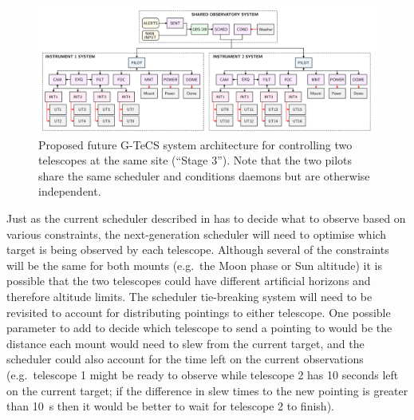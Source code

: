 \begin{colsection}
\begin{figure}[t]
    \begin{center}
        \includegraphics[width=\linewidth]{images/flow2.pdf}
    \end{center}
    \caption[Future G-TeCS system architecture for two telescopes]{
        Proposed future G-TeCS system architecture for controlling two telescopes at the same site (``Stage 3''). Note that the two pilots share the same scheduler and conditions daemons but are otherwise independent.
    }\label{fig:flow2}
\end{figure}

Just as the current scheduler described in  has to decide what to observe based on various constraints, the next-generation scheduler will need to optimise which target is being observed by each telescope. Although several of the constraints will be the same for both mounts (e.g.\ the Moon phase or Sun altitude) it is possible that the two telescopes could have different artificial horizons and therefore altitude limits. The scheduler tie-breaking system will need to be revisited to account for distributing pointings to either telescope. One possible parameter to add to decide which telescope to send a pointing to would be the distance each mount would need to slew from the current target, and the scheduler could also account for the time left on the current observations (e.g.\ telescope 1 might be ready to observe while telescope 2 has 10 seconds left on the current target; if the difference in slew times to the new pointing is greater than \SI{10}{\second} then it would be better to wait for telescope 2 to finish).


\end{colsection}
